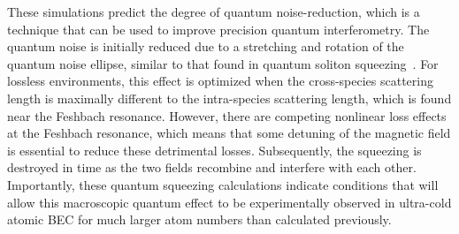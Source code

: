These simulations predict the degree of quantum noise-reduction, which
is a technique that can be used to improve precision quantum interferometry.
The quantum noise is initially reduced due to a stretching and rotation
of the quantum noise ellipse, similar to that found in quantum soliton
squeezing~\cite{Carter1987,Drummond1993a}.
For lossless environments, this effect is optimized when the cross-species
scattering length is maximally different to the intra-species scattering
length, which is found near the Feshbach resonance.
However, there are competing nonlinear loss effects at the Feshbach resonance,
which means that some detuning of the magnetic field is essential to reduce
these detrimental losses.
Subsequently, the squeezing is destroyed in time as the two fields recombine
and interfere with each other.
Importantly, these quantum squeezing calculations indicate conditions that
will allow this macroscopic quantum effect to be experimentally
observed in ultra-cold atomic BEC for much larger atom
numbers than calculated previously.

